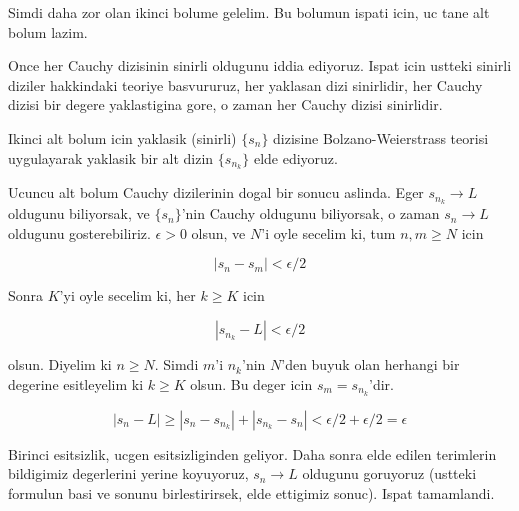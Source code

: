 \documentclass[12pt,fleqn]{article}
\begin{document}
Simdi daha zor olan ikinci bolume gelelim. Bu bolumun ispati icin, uc
tane alt bolum lazim. 

Once her Cauchy dizisinin sinirli oldugunu iddia ediyoruz. Ispat icin
ustteki sinirli diziler hakkindaki teoriye basvururuz, her yaklasan dizi
sinirlidir, her Cauchy dizisi bir degere yaklastigina gore, o zaman her
Cauchy dizisi sinirlidir.

Ikinci alt bolum icin yaklasik (sinirli) $\{s_n\}$ dizisine Bolzano-Weierstrass
teorisi uygulayarak yaklasik bir alt dizin $\{s_{n_k}\}$ elde ediyoruz. 

Ucuncu alt bolum Cauchy dizilerinin dogal bir sonucu aslinda. Eger
 $s_{n_k}
\to L$ oldugunu biliyorsak, ve $\{s_n\}$'nin Cauchy oldugunu biliyorsak, o
zaman $s_n \to L$ oldugunu gosterebiliriz. $\epsilon > 0$ olsun, ve $N$'i
oyle secelim ki, tum $n,m \ge N$ icin

\[ |s_n - s_m| < \epsilon/2 \]

Sonra $K$'yi oyle secelim ki, her $k \ge K$ icin

\[ |s_{n_k} - L| < \epsilon/2 \]

olsun. Diyelim ki $n \ge N$. Simdi $m$'i $n_k$'nin $N$'den buyuk olan herhangi
bir degerine esitleyelim ki $k \ge K$ olsun. Bu deger icin $s_m =
s_{n_k}$'dir. 

\[ |s_n - L| \ge |s_n - s_{n_k}| + |s_{n_k} - s_n| < 
\epsilon/2 + \epsilon/2 = \epsilon 
\]

Birinci esitsizlik, ucgen esitsizliginden geliyor. Daha sonra elde edilen
terimlerin bildigimiz degerlerini yerine koyuyoruz, $s_n \to L$ oldugunu
goruyoruz (ustteki formulun basi ve sonunu birlestirirsek, elde ettigimiz
sonuc). Ispat tamamlandi. 
\end{document}
